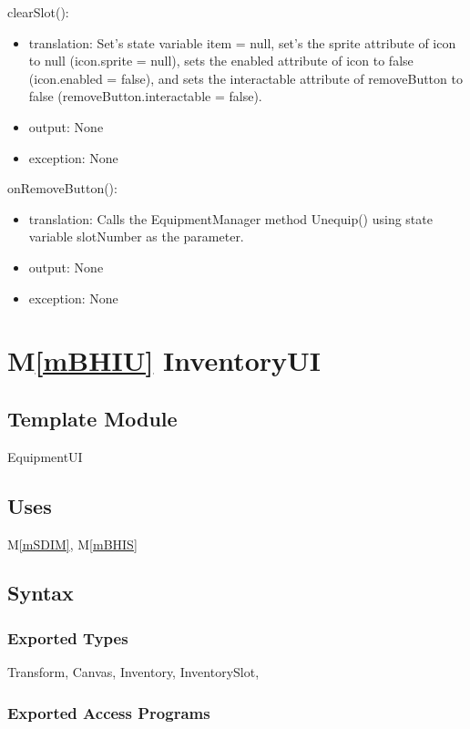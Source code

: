 \documentclass[12pt]{article}
\newcommand{\mref}[1]{M\ref{#1}}
\begin{document}
\noindent clearSlot():
\begin{itemize}
\item translation: Set's state variable item = null, set's the sprite attribute of icon to null (icon.sprite = null), sets the enabled attribute of icon to false (icon.enabled = false), and sets the interactable attribute of removeButton to false (removeButton.interactable = false).
\item output: None
\item exception: None
\end{itemize}

\noindent onRemoveButton():
\begin{itemize}
\item translation: Calls the EquipmentManager method Unequip() using state variable slotNumber as the parameter.
\item output: None
\item exception: None
\end{itemize}

\newpage

\section* {\mref{mBHIU} InventoryUI}

\subsection*{Template Module}

EquipmentUI

\subsection* {Uses}

\mref{mSDIM}, \mref{mBHIS}

\subsection* {Syntax}

\subsubsection* {Exported Types}

Transform, Canvas, Inventory, InventorySlot, 

\subsubsection* {Exported Access Programs}
\end{document}
